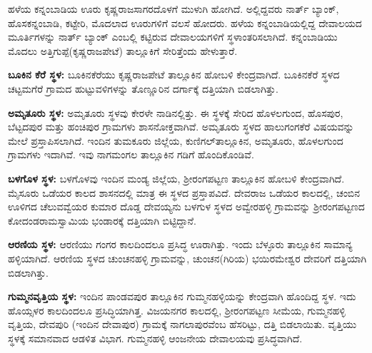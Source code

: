 ಹಳೆಯ ಕನ್ನಂಬಾಡಿಯ ಊರು ಕೃಷ್ಣರಾಜಸಾಗರದೊಳಗೆ ಮುಳುಗಿ ಹೋಗಿದೆ. ಅಲ್ಲಿದ್ದವರು ನಾರ್ತ್ ಬ್ಯಾಂಕ್, ಹೊಸಕನ್ನಂಬಾಡಿ, ಕಟ್ಟೇರಿ, ಮೊದಲಾದ ಊರುಗಳಿಗೆ ವಲಸೆ ಹೋದರು. ಹಳೆಯ ಕನ್ನಂಬಾಡಿಯಲ್ಲಿದ್ದ ದೇವಾಲಯದ ಮೂರ್ತಿಗಳನ್ನು ನಾರ್ತ್ ಬ್ಯಾಂಕ್​ ಎಂಬಲ್ಲಿ ಕಟ್ಟಿರುವ ದೇವಾಲಯಗಳಿಗೆ ಸ್ಥಳಾಂತರಿಸಲಾಗಿದೆ. ಕನ್ನಂಬಾಡಿಯು ಮೊದಲು ಅತ್ತಿಗುಪ್ಪೆ(ಕೃಷ್ಣರಾಜಪೇಟೆ) ತಾಲ್ಲೂಕಿಗೆ ಸೇರಿತ್ತೆಂದು ಹೇಳುತ್ತಾರೆ.

\textbf{ಬೂಕಿನ ಕೆರೆ ಸ್ಥಳ:} ಬೂಕಿನಕೆರೆಯು ಕೃಷ್ಣರಾಜಪೇಟೆ ತಾಲ್ಲೂಕಿನ ಹೋಬಳಿ ಕೇಂದ್ರವಾಗಿದೆ. ಬೂಕಿನಕೆರೆ ಸ್ಥಳದ ಚಟ್ಟಮಗೆರೆ ಗ್ರಾಮದ ಹುಟ್ಟುವಳಿಗಳನ್ನು ತೊಣ್ಣೂರಿನ ದರ್ಗಾಕ್ಕೆ ದತ್ತಿಯಾಗಿ ಬಿಡಲಾಗಿತ್ತು.

\textbf{ಅಮೃತೂರು ಸ್ಥಳ:} ಅಮೃತೂರು ಸ್ಥಳವು ಕೇರಳೇ ನಾಡಿನಲ್ಲಿತ್ತು. ಈ ಸ್ಥಳಕ್ಕೆ ಸೇರಿದ ಹೊಳಲಗುಂದ, ಹೊಸಪುರ, ಬೆಟ್ಟದಪುರ ಮತ್ತು ಹಂಚಿಪುರ ಗ್ರಾಮಗಳು ಶಾಸನೋಕ್ತವಾಗಿವೆ. ಅಮೃತೂರು ಸ್ಥಳದ ಹಾಲುಗಂಗಕೆರೆ ವಿಷಯವನ್ನು ಮೇಲೆ ಪ್ರಸ್ತಾಪಿಸಲಾಗಿದೆ. ಇಂದಿನ ತುಮಕೂರು ಜಿಲ್ಲೆಯ, ಕುಣಿಗಲ್​ ತಾಲ್ಲೂಕಿನ, ಅಮೃತೂರು, ಹೊಳಲಗುಂದ ಗ್ರಾಮಗಳು ಇದಾಗಿವೆ. ಇವು ನಾಗಮಂಗಲ ತಾಲ್ಲೂಕಿನ ಗಡಿಗೆ ಹೊಂದಿಕೊಂಡಿವೆ.

\textbf{ಬಳಗೊಳ ಸ್ಥಳ:} ಬಳಗೊಳವು ಇಂದಿನ ಮಂಡ್ಯ ಜಿಲ್ಲೆಯ, ಶ‍್ರೀರಂಗಪಟ್ಟಣ ತಾಲ್ಲೂಕಿನ ಹೋಬಳಿ ಕೇಂದ್ರವಾಗಿದೆ. ಮೈಸೂರು ಒಡೆಯರ ಕಾಲದ ಶಾಸನದಲ್ಲಿ ಮಾತ್ರ ಈ ಸ್ಥಳದ ಪ್ರಸ್ತಾಪವಿದೆ. ದೇವರಾಜ ಒಡೆಯರ ಕಾಲದಲ್ಲಿ, ಚಂಬಿನ ಊಳಿಗದ ಚೆಲುವವ್ವೆಯರ ಕುಮಾರ ದೊಡ್ಡ ದೇವಯ್ಯನು ಬಳಗುಳ ಸ್ಥಳದ ಅವ್ವೇರಹಳ್ಳಿ ಗ್ರಾಮವನ್ನು ಶ‍್ರೀರಂಗಪಟ್ಟಣದ ಕೋದಂಡರಾಮಸ್ವಾಮಿಯ ಭಂಡಾರಕ್ಕೆ ದತ್ತಿಯಾಗಿ ಬಿಟ್ಟಿದ್ದಾನೆ.

\textbf{ಆರಣಿಯ ಸ್ಥಳ:} ಆರಣಿಯು ಗಂಗರ ಕಾಲದಿಂದಲೂ ಪ್ರಸಿದ್ಧ ಊರಾಗಿತ್ತು. ಇಂದು ಬೆಳ್ಳೂರು ತಾಲ್ಲೂಕಿನ ಸಾಮಾನ್ಯ ಹಳ್ಳಿಯಾಗಿದೆ. ಆರಣಿಯ ಸ್ಥಳದ ಚುಂಚನಹಳ್ಳಿ ಗ್ರಾಮವನ್ನು, ಚುಂಚನ(ಗಿರಿಯ) ಭಯಿರಮೇಶ್ವರ ದೇವರಿಗೆ ದತ್ತಿಯಾಗಿ ಬಿಡಲಾಗಿತ್ತು.

\textbf{ಗುಮ್ಮನವೃತ್ತಿಯ ಸ್ಥಳ:} ಇಂದಿನ ಪಾಂಡವಪುರ ತಾಲ್ಲೂಕಿನ ಗುಮ್ಮನಹಳ್ಳಿಯನ್ನು ಕೇಂದ್ರವಾಗಿ ಹೊಂದಿದ್ದ ಸ್ಥಳ. ಇದು ಹೊಯ್ಸಳರ ಕಾಲದಿಂದಲೂ ಪ್ರಸಿದ್ಧಿಯಾಗಿತ್ತ. ವಿಜಯನಗರ ಕಾಲದಲ್ಲಿ, ಶ‍್ರೀರಂಗಪಟ್ಟಣ ಸೀಮೆಯ, ಗುಮ್ಮನಹಳ್ಳಿ ವೃತ್ತಿಯ, ದೇವಪುರಿ (ಇಂದಿನ ದೇವಾಪುರ) ಗ್ರಾಮಕ್ಕೆ ನಾಗಲಾಪುರವೆಂಬ ಹೆಸರಿಟ್ಟು, ದತ್ತಿ ಬಿಡಲಾಯಿತು. ವೃತ್ತಿಯು ಸ್ಥಳಕ್ಕೆ ಸಮಾನವಾದ ಆಡಳಿತ ವಿಭಾಗ. ಗುಮ್ಮನಹಳ್ಳಿ ಆಂಜನೇಯ ದೇವಾಲಯವು ಪ್ರಸಿದ್ಧವಾಗಿದೆ.

